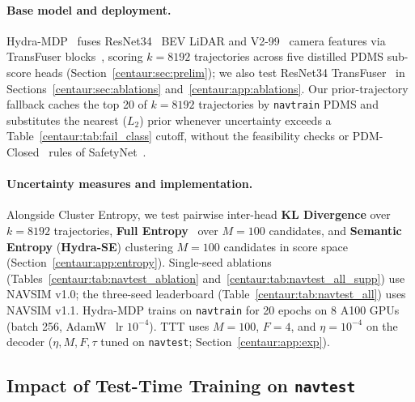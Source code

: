 \paragraph{Base model and deployment.} Hydra-MDP~\cite{li2024hydramdp} fuses ResNet34~\cite{he2016deep} BEV LiDAR and \mbox{V2-99}~\cite{park2021pseudo} camera features via TransFuser blocks~\cite{chitta2023transfuser}, scoring $k=8192$ trajectories across five distilled PDMS sub-score heads (Section~\ref{centaur:sec:prelim}); we also test ResNet34 TransFuser~\cite{chitta2023transfuser} in Sections~\ref{centaur:sec:ablations} and~\ref{centaur:app:ablations}. Our prior-trajectory fallback caches the top 20 of $k=8192$ trajectories by \texttt{navtrain} PDMS and substitutes the nearest ($L_2$) prior whenever uncertainty exceeds a Table~\ref{centaur:tab:fail_class} cutoff, without the feasibility checks or PDM-Closed~\cite{dauner2023parting} rules of SafetyNet~\cite{vitelli2022safetynet}.

\paragraph{Uncertainty measures and implementation.} Alongside Cluster Entropy, we test pairwise inter-head \textbf{KL Divergence} over $k=8192$ trajectories, \textbf{Full Entropy}~\cite{shannon1948entropy} over $M=100$ candidates, and \textbf{Semantic Entropy} (\textbf{Hydra-SE}) clustering $M=100$ candidates in score space~\cite{kuhn2023semantic} (Section~\ref{centaur:app:entropy}). Single-seed ablations (Tables~\ref{centaur:tab:navtest_ablation} and~\ref{centaur:tab:navtest_all_supp}) use NAVSIM v1.0; the three-seed leaderboard (Table~\ref{centaur:tab:navtest_all}) uses NAVSIM v1.1. Hydra-MDP trains on \texttt{navtrain} for 20 epochs on 8 A100 GPUs (batch 256, AdamW~\cite{loshchilov2017decoupled} lr $10^{-4}$). TTT uses $M=100$, $F=4$, and $\eta = 10^{-4}$ on the decoder ($\eta, M, F, \tau$ tuned on \texttt{navtest}; Section~\ref{centaur:app:exp}).

\subsection{Impact of Test-Time Training on \texorpdfstring{\texttt{navtest}}{navtest}}\label{centaur:sec:results}

